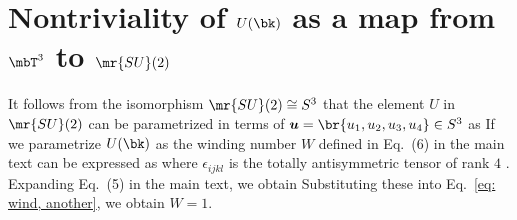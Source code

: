 \documentclass[
floatfix,
pra,
twocolumn,
reprint,
amsmath,amssymb,
aps,
footnote,
]{revtex4}
\begin{document}
\section{\label{sec: smash}Nontriviality of $U(\bk)$ as a map from $\mbT^3$ to $\mr{SU}(2)$}
It follows from the isomorphism $\mr{SU}(2) \cong S^3$ that the element $U$ in $\mr{SU}(2)$ can be parametrized in terms of $\bm{u} = \br{u_1, u_2, u_3, u_4} \in S^3$ as
If we parametrize $U(\bk)$ as
the winding number $W$ defined in Eq.~(6) in the main text can be expressed as
where $\epsilon_{ijkl}$ is the totally antisymmetric tensor of rank $4$ \cite{MantonN04}.
Expanding Eq.~(5) in the main text,
we obtain
Substituting these into Eq.~\eqref{eq: wind, another}, we obtain $W = 1$.
\end{document}
